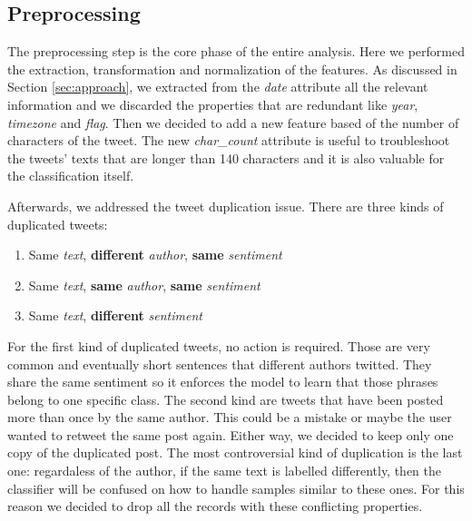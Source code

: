 \documentclass[conference]{IEEEtran}
\begin{document}
\subsection{Preprocessing}\label{sec:preprocessing}
The preprocessing step is the core phase of the entire analysis. Here we performed the extraction, transformation and normalization of the features. As discussed in Section \ref{sec:approach}, we extracted from the \textit{date} attribute all the relevant information and we discarded the properties that are redundant like \textit{year}, \textit{timezone} and \textit{flag}. Then we decided to add a new feature based of the number of characters of the tweet. The new \textit{char\_count} attribute is useful to troubleshoot the tweets' texts that are longer than 140 characters and it is also valuable for the classification itself.

Afterwards, we addressed the tweet duplication issue. There are three kinds of duplicated tweets:
\begin{enumerate}
    \item Same \textit{text}, \textbf{different} \textit{author}, \textbf{same} \textit{sentiment}
    \item Same \textit{text}, \textbf{same} \textit{author}, \textbf{same} \textit{sentiment}
    \item Same \textit{text}, \textbf{different} \textit{sentiment}
\end{enumerate}
For the first kind of duplicated tweets, no action is required. Those are very common and eventually short sentences that different authors twitted. They share the same sentiment so it enforces the model to learn that those phrases belong to one specific class. The second kind are tweets that have been posted more than once by the same author. This could be a mistake or maybe the user wanted to retweet the same post again. Either way, we decided to keep only one copy of the duplicated post. The most controversial kind of duplication is the last one: regardaless of the author, if the same text is labelled differently, then the classifier will be confused on how to handle samples similar to these ones. For this reason we decided to drop all the records with these conflicting properties.
\end{document}
